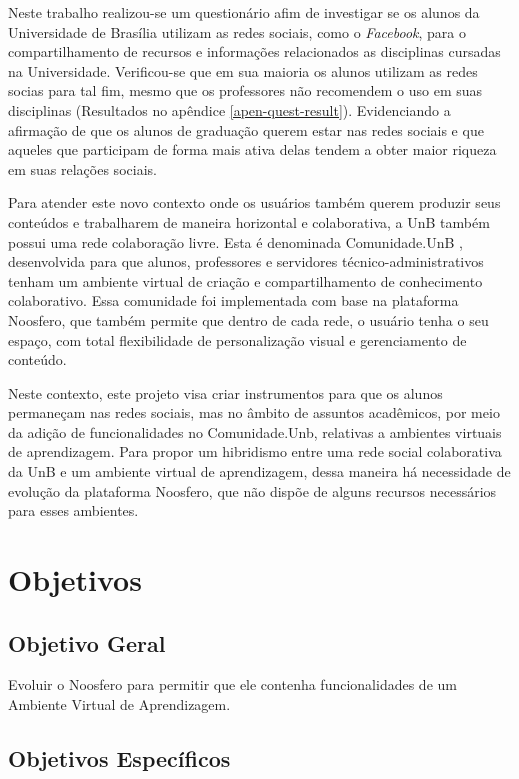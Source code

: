 Neste trabalho realizou-se um questionário afim de investigar se os alunos da Universidade de Brasília utilizam as redes sociais, como o \textit{Facebook}, para o compartilhamento de recursos e informações relacionados as disciplinas cursadas na Universidade. Verificou-se que em sua maioria os alunos utilizam as redes socias para tal fim, mesmo que os professores não recomendem o uso em suas disciplinas (Resultados no apêndice \ref{apen-quest-result}). Evidenciando a afirmação de  que os alunos de graduação querem estar nas redes sociais e que aqueles que participam de forma mais ativa delas tendem a obter maior riqueza em suas relações sociais.

Para atender este novo contexto onde os usuários também querem produzir seus conteúdos e trabalharem de maneira horizontal e colaborativa, a UnB também possui uma rede colaboração livre. Esta é denominada Comunidade.UnB , desenvolvida para que alunos, professores e servidores técnico-administrativos tenham um ambiente virtual de criação e compartilhamento de conhecimento colaborativo. Essa comunidade foi implementada com base na plataforma Noosfero, que também permite que dentro de cada rede, o usuário tenha o seu espaço, com total flexibilidade de personalização visual e gerenciamento de conteúdo.

Neste contexto, este projeto visa criar instrumentos para que os alunos permaneçam nas redes sociais, mas no âmbito de assuntos acadêmicos, por meio da adição de funcionalidades no Comunidade.Unb, relativas a ambientes virtuais de aprendizagem. Para propor um hibridismo entre uma rede social colaborativa da UnB e um ambiente virtual de aprendizagem, dessa maneira há necessidade de evolução da plataforma Noosfero, que não dispõe de alguns recursos necessários para esses ambientes.

\section{Objetivos}

\subsection{Objetivo Geral}

Evoluir o Noosfero para permitir que ele contenha funcionalidades de um Ambiente Virtual de Aprendizagem.

\subsection{Objetivos Específicos}

